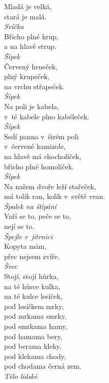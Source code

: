 \begin{multicols}{4}
\noindent
Mladá je velká,\\
stará je malá.\\[1 mm]
{\sl Svíčka}\\

\noindent
Břicho plné krup,\\
a na hlavě strup.\\[1 mm]
{\sl Šípek}\\

\noindent
Červený hrneček,\\
plný krupeček,\\
na vrchu střapeček.\\[1 mm]
{\sl Šípek}\\

\noindent
Na poli je kabela,\\
v~té kabele plno kabéleček.\\[1 mm]
{\sl Šípek}\\

\noindent
Sedí panna v~širém poli\\
v~červené kamizole,\\
na hlavě má chocholíček,\\
břicho plné homoliček.\\[1 mm]
{\sl Šípek}\\

\noindent
Na našem dvoře leží stařeček,\\
má tolik ran, kolik v~světě vran.\\[1 mm]
{\sl Špalek na štípání}\\

\noindent
Vaří se to, peče se to,\\
nejí se to.\\[1 mm]
{\sl Špejle v~jitrnici}\\

\noindent
Kopyta mám,\\
přec nejsem zvíře.\\[1 mm]
{\sl Švec}\\

\noindent
Stojí, stojí hůrka,\\
na té hůrce kulka,\\
na té kulce lesíček,\\
pod lesíčkem mrky,\\
pod mrkama smrky,\\
pod smrkama hamy,\\
pod hamama bery,\\
pod berama kleky,\\
pod klekama chody,\\
pod chodama černá zem.\\[1 mm]
{\sl Tělo lidské}\\


\end{multicols}

